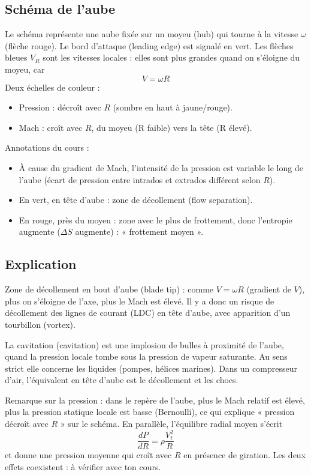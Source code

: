 \documentclass{article}
\begin{document}
\subsection{Schéma de l'aube}
Le schéma représente une aube fixée sur un moyeu (hub) qui tourne à la vitesse $\omega$ (flèche rouge). Le bord d'attaque (leading edge) est signalé en vert. Les flèches bleues $V_R$ sont les vitesses locales : elles sont plus grandes quand on s'éloigne du moyeu, car
\[ V = \omega R \]
Deux échelles de couleur :
\begin{itemize}
\item Pression : décroît avec $R$ (sombre en haut à jaune/rouge).
\item Mach : croît avec $R$, du moyeu (R faible) vers la tête (R élevé).
\end{itemize}
Annotations du cours :
\begin{itemize}
\item À cause du gradient de Mach, l'intensité de la pression est variable le long de l'aube (écart de pression entre intrados et extrados différent selon $R$).
\item En vert, en tête d'aube : zone de décollement (flow separation).
\item En rouge, près du moyeu : zone avec le plus de frottement, donc l'entropie augmente ($\Delta S$ augmente) : « frottement moyen ».
\end{itemize}

\subsection{Explication}
Zone de décollement en bout d'aube (blade tip) : comme $V = \omega R$ (gradient de $V$), plus on s'éloigne de l'axe, plus le Mach est élevé. Il y a donc un risque de décollement des lignes de courant (LDC) en tête d'aube, avec apparition d'un tourbillon (vortex).

La cavitation (cavitation) est une implosion de bulles à proximité de l'aube, quand la pression locale tombe sous la pression de vapeur saturante. Au sens strict elle concerne les liquides (pompes, hélices marines). Dans un compresseur d'air, l'équivalent en tête d'aube est le décollement et les chocs.

Remarque sur la pression : dans le repère de l'aube, plus le Mach relatif est élevé, plus la pression statique locale est basse (Bernoulli), ce qui explique « pression décroît avec $R$ » sur le schéma. En parallèle, l'équilibre radial moyen s'écrit
\[ \frac{dP}{dR} = \rho \frac{V_t^2}{R} \]
et donne une pression moyenne qui croît avec $R$ en présence de giration. Les deux effets coexistent : à vérifier avec ton cours.
\end{document}
